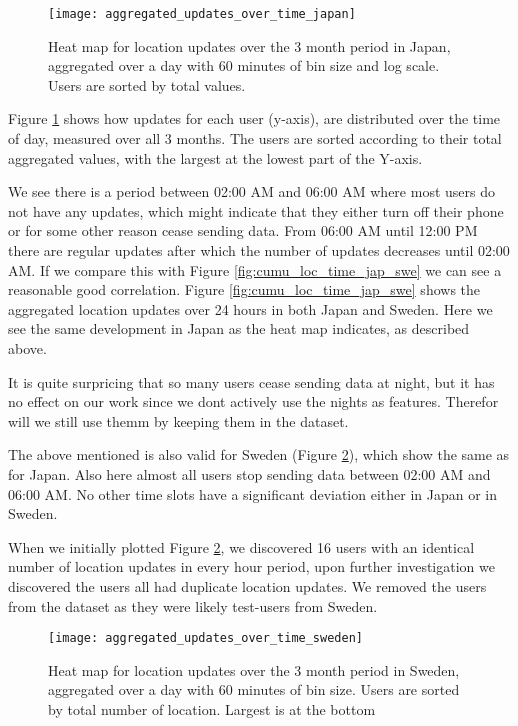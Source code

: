 \begin{figure}[H]
    \hspace*{-0.8cm}
    \centering
    \texttt{[image: aggregated\_updates\_over\_time\_japan]}
    \caption{Heat map for location updates over the 3 month period in Japan, aggregated over a day with 60 minutes of bin size and log scale. Users are sorted by total values.}
    \label{fig:agg_heatmap_jap}
\end{figure}
Figure \ref{fig:agg_heatmap_jap} shows how updates for each user (y-axis), are distributed over the time of day, measured over all 3 months. The users are sorted according to their total aggregated values, with the largest at the lowest part of the Y-axis.  

We see there is a period between 02:00 AM and 06:00 AM where most users do not have any updates, which might indicate that they either turn off their phone or for some other reason cease sending data. From 06:00 AM until 12:00 PM there are regular updates after which the number of updates decreases until 02:00 AM. If we compare this with Figure \ref{fig:cumu_loc_time_jap_swe} we can see a reasonable good correlation. Figure \ref{fig:cumu_loc_time_jap_swe} shows the  aggregated location updates over 24 hours in both Japan and Sweden. Here we see the same development in Japan as the heat map indicates, as described above. 

It is quite surpricing that so many users cease sending data at night, but it has no effect on our work since we dont actively use the nights as features. Therefor will we still use themm by keeping them in the dataset. 

The above mentioned is also valid for Sweden (Figure \ref{fig:agg_heatmap_swe}), which show the same as for Japan. Also here almost all users stop sending data between 02:00 AM and 06:00 AM. 
No other time slots have a significant deviation either in Japan or in Sweden.

When we initially plotted Figure \ref{fig:agg_heatmap_swe}, we discovered 16 users with an identical number of location updates in every hour period, upon further investigation we discovered the users all had duplicate location updates. We removed the users from the dataset as they were likely test-users from Sweden.

\begin{figure}[H]
    \hspace*{-0.8cm}
    \centering
    \texttt{[image: aggregated\_updates\_over\_time\_sweden]}
    \caption{Heat map for location updates over the 3 month period in Sweden, aggregated over a day with 60 minutes of bin size. Users are sorted by total number of location. Largest is at the bottom}
    \label{fig:agg_heatmap_swe}
\end{figure}

